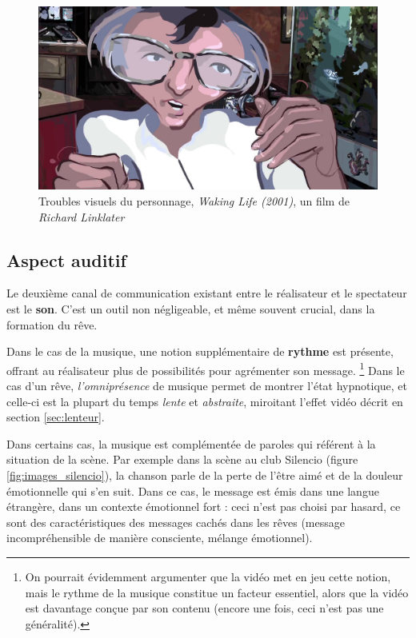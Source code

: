 \documentclass[../main.tex]{subfile}
\begin{document}
\begin{figure}
    \centering
    \includegraphics[width=\linewidth]{images/trouble2}
    \caption{Troubles visuels du personnage, \textit{Waking Life (2001)}, un
             film de \textit{Richard Linklater}}
    \label{fig:images_trouble2}
\end{figure}

\subsection{Aspect auditif}

Le deuxième canal de communication existant entre le réalisateur et le
spectateur est le \textbf{son}. C'est un outil non négligeable, et même souvent
crucial, dans la formation du rêve.

Dans le cas de la musique, une notion supplémentaire de \textbf{rythme} est
présente, offrant au réalisateur plus de possibilités pour agrémenter son
message. \footnote{On pourrait évidemment argumenter que la vidéo met en jeu
cette notion, mais le rythme de la musique constitue un facteur essentiel,
alors que la vidéo est davantage conçue par son contenu (encore une fois,
ceci n'est pas une généralité).} Dans le cas d'un rêve, \emph{l'omniprésence}
de musique permet de montrer l'état hypnotique, et celle-ci est la plupart du
temps \emph{lente} et \emph{abstraite}, miroitant l'effet vidéo décrit en
section \ref{sec:lenteur}.

Dans certains cas, la musique est complémentée de paroles qui référent à la
situation de la scène. Par exemple dans la scène au club Silencio (figure
\ref{fig:images_silencio}), la chanson parle de la perte de l'être aimé et de la
douleur émotionnelle qui s'en suit. Dans ce cas, le message est émis dans une
langue étrangère, dans un contexte émotionnel fort : ceci n'est pas choisi par
hasard, ce sont des caractéristiques des messages cachés dans les rêves
(message incompréhensible de manière consciente, mélange émotionnel).
\end{document}
